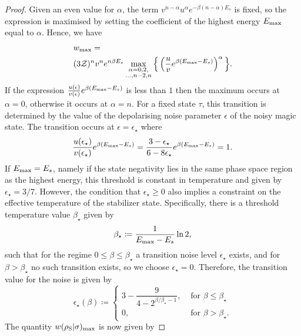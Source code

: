 \begin{proof}
Given an even value for $\alpha$, the term $v^{n-\alpha} u^{\alpha} e^{-\beta (n-\alpha)E_s}$ is fixed, so the expression is maximised by setting the coefficient of the highest energy $E_{\rm{max}}$ equal to $\alpha$.
Hence, we have
\begin{align}
	&w_{\rm max} = \nonumber\\
	&(3\mathcal{Z})^{n} v^n e^{n\beta E_s}\max\limits_{\substack{\alpha = 0,2, \\ \dots,n-2,n}}{\Big\{ \left( \frac{u}{v} e^{\beta (E_{\rm{max}} - E_s)} \right)^{\alpha} \Big\}}.
\end{align}
If the expression $\frac{u(\epsilon)}{v(\epsilon)} e^{\beta (E_{\rm{max}} - E_s)}$ is less than $1$ then the maximum occurs at $\alpha=0$, otherwise it occurs at $\alpha = n$. For a fixed state $\tau$, this transition is determined by the value of the depolarising noise parameter $\epsilon$ of the noisy magic state. The transition occurs at $\epsilon = \epsilon_\star$ where
\begin{equation}\label{eq:noise_transition}
	\frac{u(\epsilon_\star)}{v(\epsilon_\star)} e^{\beta (E_{\rm{max}} - E_s)} = \frac{3-\epsilon_\star}{6-8\epsilon_\star} e^{\beta (E_{\rm{max}} - E_s)} = 1.
\end{equation}
If $E_{\rm{max}} = E_s$, namely if the state negativity lies in the same phase space region as the highest energy, this threshold is constant in temperature and given by $\epsilon_{\star} = 3/7$. However, the condition that $\epsilon_\star \ge 0$ also implies a constraint on the effective temperature of the stabilizer state. Specifically, there is a threshold temperature value $\beta_\star$ given by
\begin{equation}
	\beta_{\star} \coloneqq \frac{1}{E_{\rm{max}} - E_s} \ln2,
\end{equation}
such that for the regime $0 \leq \beta \leq \beta_\star$ a transition noise level $\epsilon_\star$ exists, and for $\beta > \beta_\star$ no such transition exists, so we choose $\epsilon_\star = 0$. 
Therefore, the transition value for the noise is given by
\begin{equation}
	\epsilon_{\star}(\beta) \coloneqq 
	\begin{cases}
		3 - \dfrac{9}{4-2^{\beta/\beta_\star - 1}}, &\text{ for } \beta \leq \beta_\star \\
		0, &\text{ for } \beta > \beta_\star.
	\end{cases}
\end{equation}
The quantity $w(\rho_{\rm{S}} | \sigma)_{\rm{max}}$ is now given by

\end{proof}
